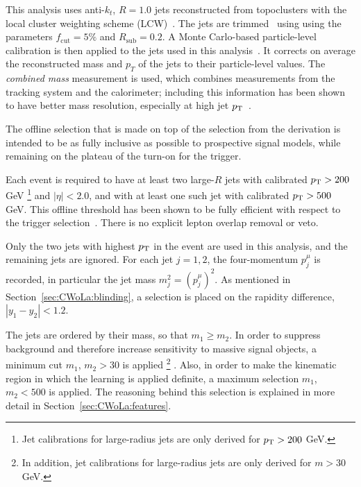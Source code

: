 This analysis uses anti-$k_t$, $R=1.0$ jets reconstructed from topoclusters with the local cluster weighting scheme (LCW)~\cite{Aad:2016upy}.
The jets are trimmed~\cite{Krohn:2009th} using using the parameters $f_\text{cut} = 5\%$ and $R_\text{sub} = 0.2$.
A Monte Carlo-based particle-level calibration is then applied to the jets used in this analysis~\cite{Aaboud:2018kfi}.
It corrects on average the reconstructed mass and $p_T$ of the jets to their particle-level values.
The \textit{combined mass} measurement is used, which combines measurements from the tracking system and the calorimeter; including this information has been shown to have better mass resolution, especially at high jet $p_{\text{T}}$~\cite{ATLAS-CONF-2016-035}.

The offline selection that is made on top of the selection from the derivation is intended to be as fully inclusive as possible to prospective signal models, while remaining on the plateau of the turn-on for the trigger.

Each event is required to have at least two large-$R$ jets with calibrated $p_{\text{T}}>200$ GeV
\footnote{Jet calibrations for large-radius jets are only derived for $p_{\text{T}}>200$ GeV.
}
and $|\eta|<2.0$, and with at least one such jet with calibrated $p_{\text{T}}>500$ GeV.
This offline threshold has been shown to be fully efficient with respect to the trigger selection~\cite{Adorni:2647394}.
There is no explicit lepton overlap removal or veto.

Only the two jets with highest $p_{\text{T}}$ in the event are used in this analysis, and the remaining jets are ignored.
For each jet $j=1,2$, the four-momentum $p^\mu_j$ is recorded, in particular the jet mass $m_j^2 = (p^\mu_j)^2$.
As mentioned in Section~\ref{sec:CWoLa:blinding}, a selection is placed on the rapidity difference, $|y_1-y_2|<1.2$.

The jets are ordered by their mass, so that $m_1 \ge m_2$.
In order to suppress background and therefore increase sensitivity to massive signal objects, a minimum cut $m_1$, $m_2 > 30$ \GeV{} is applied
\footnote{In addition, jet calibrations for large-radius jets are only derived for $m>30$ GeV.}
.
Also, in order to make the kinematic region in which the learning is applied definite, a maximum selection $m_1$, $m_2 < 500$ \GeV{} is applied.
The reasoning behind this selection is explained in more detail in Section~\ref{sec:CWoLa:features}.

